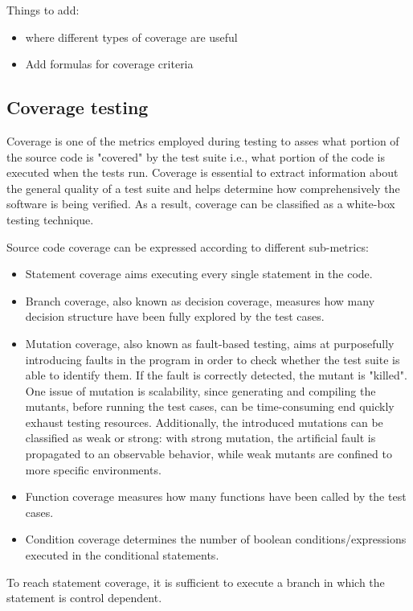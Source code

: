 Things to add:
\begin{itemize}
    \item where different types of coverage are useful
    \item Add formulas for coverage criteria
\end{itemize}


\subsection*{Coverage testing}
Coverage is one of the metrics employed during testing to asses what portion of the source code is "covered" by the test suite i.e., 
what portion of the code is executed when the tests run. Coverage is essential to extract information about the general quality of a test suite
and helps determine how comprehensively the software is being verified.
As a result, coverage can be classified as a white-box testing technique.


Source code coverage can be expressed according to different sub-metrics:
\begin {itemize}
    \item Statement coverage aims executing every single statement in the code.
    \item Branch coverage, also known as decision coverage, measures how many decision structure have been fully explored by the test cases.
    \item Mutation coverage, also known as fault-based testing, aims at purposefully introducing faults in the program in order to 
            check whether the test suite is able to identify them. If the fault is correctly detected, the mutant is "killed".
            One issue of mutation is scalability, since generating and compiling the mutants, before running the test cases, can be time-consuming end quickly exhaust testing resources. Additionally, the introduced mutations can be classified as weak or strong: with strong mutation, the artificial fault is propagated to an observable behavior, while weak mutants are confined to more 
            specific environments.
    \item Function coverage measures how many functions have been called by the test cases.
    \item Condition coverage determines the number of boolean conditions/expressions executed in the conditional statements.
\end {itemize}

To reach statement coverage, it is sufficient to execute a branch in which the statement is control dependent.

